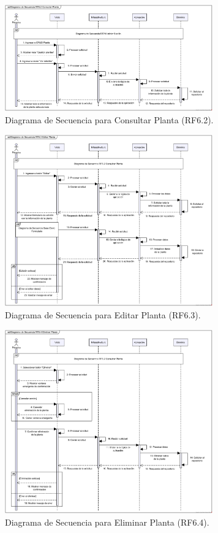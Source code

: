 \begin{figure}[H]
	\centering
		\caption{Diagrama de Secuencia para Consultar Planta (RF6.2).}
	\includegraphics[width=0.8\textwidth]{UML/Secuencia/Diagrama de Secuencia RF6.2 Consultar Planta.png}
\end{figure}


\begin{figure}[H]
	\centering
	\caption{Diagrama de Secuencia para Editar Planta (RF6.3).}
 \includegraphics[width=0.8\textwidth]{UML/Secuencia/Diagrama de Secuencia RF6.3 Editar Planta.png}
\end{figure}


\begin{figure}[H]
	\centering
	\caption{Diagrama de Secuencia para Eliminar Planta (RF6.4).}
 \includegraphics[width=0.8\textwidth]{UML/Secuencia/Diagrama de Secuencia RF6.4 Eliminar Planta.png}
\end{figure}


